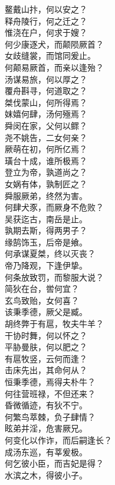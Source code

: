 \documentclass[]{article}
\begin{document}
鳌戴山抃，何以安之？\\
释舟陵行，何之迁之？\\
惟浇在户，何求于嫂？\\
何少康逐犬，而颠陨厥首？\\
女歧缝裳，而馆同爰止。\\
何颠易厥首，而亲以逢殆？\\
汤谋易旅，何以厚之？\\
覆舟斟寻，何道取之？\\
桀伐蒙山，何所得焉？\\
妺嬉何肆，汤何殛焉？\\
舜闵在家，父何以鳏？\\
尧不姚告，二女何亲？\\
厥萌在初，何所亿焉？\\
璜台十成，谁所极焉？\\
登立为帝，孰道尚之？\\
女娲有体，孰制匠之？\\
舜服厥弟，终然为害。\\
何肆犬豕，而厥身不危败？\\
吴获迄古，南岳是止。\\
孰期去斯，得两男子？\\
缘鹄饰玉，后帝是飨。\\
何承谋夏桀，终以灭丧？\\
帝乃降观，下逢伊挚。\\
何条放致罚，而黎服大说？\\
简狄在台，喾何宜？\\
玄鸟致贻，女何喜？\\
该秉季德，厥父是臧。\\
胡终弊于有扈，牧夫牛羊？\\
干协时舞，何以怀之？\\
平胁曼肤，何以肥之？\\
有扈牧竖，云何而逢？\\
击床先出，其命何从？\\
恒秉季德，焉得夫朴牛？\\
何往营班禄，不但还来？\\
昏微循迹，有狄不宁。\\
何繁鸟萃棘，负子肆情？\\
眩弟并淫，危害厥兄。\\
何变化以作诈，而后嗣逢长？\\
成汤东巡，有莘爰极。\\
何乞彼小臣，而吉妃是得？\\
水滨之木，得彼小子。\\
\end{document}
